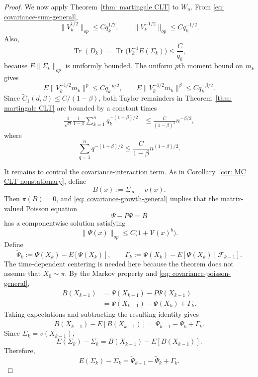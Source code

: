 \documentclass[11pt]{article}
\newcommand{\ve}{\mathscr{V}}
\begin{document}
\begin{proof}
We now apply Theorem~\ref{thm: martingale CLT} to $W_n$. From
\eqref{eq: covariance-sum-general},
\[
    \|V_k^{1/2}\|_{op}\leq Cq_k^{1/2},
    \qquad
    \|V_k^{-1/2}\|_{op}\leq Cq_k^{-1/2}.
\]
Also,
\[
    \operatorname{Tr}(D_k)
    =
    \operatorname{Tr}\bigl(V_k^{-1}E(\Sigma_k)\bigr)
    \leq
    \frac{C}{q_k},
\]
because $E\|\Sigma_k\|_{op}$ is uniformly bounded. The uniform $p$th
moment bound on $m_k$ gives
\[
    E\|V_k^{-1/2}m_k\|^p\leq Cq_k^{-p/2},
    \qquad
    E\|V_k^{-1/2}m_k\|^\beta\leq Cq_k^{-\beta/2}.
\]
Since $\widetilde C_1(d,\beta)\leq C/(1-\beta)$, both Taylor remainders in
Theorem~\ref{thm: martingale CLT} are bounded by a constant times
\begin{align*}
\frac1{\sqrt n}\frac1{1-\beta}
\sum_{k=1}^n q_k^{-(1+\beta)/2}
&\leq
\frac{C}{(1-\beta)^2}n^{-\beta/2},
\end{align*}
where
\[
    \sum_{q=1}^n q^{-(1+\beta)/2}
    \leq
    \frac{C}{1-\beta}n^{(1-\beta)/2}.
\]

It remains to control the covariance-interaction term. As in Corollary~\ref{cor: MC CLT nonstationary}, define
\[
    B(x):=\Sigma_\infty-v(x).
\]
Then $\pi (B)=0$, and \eqref{eq: covariance-growth-general} implies that the
matrix-valued Poisson equation
\begin{equation}\label{eq: covariance-poisson-general}
    \Psi-P\Psi=B
\end{equation}
has a componentwise solution satisfying
\begin{equation}\label{eq: covariance-poisson-growth-general}
    \|\Psi(x)\|_{op}
    \leq
    C\bigl(1+\ve(x)^b\bigr).
\end{equation}
Define
\[
    \widetilde\Psi_k
    :=
    \Psi(X_k)-E[\Psi(X_k)],
    \qquad
    \Gamma_k
    :=
    \Psi(X_k)-E[\Psi(X_k)\mid\mathcal F_{k-1}].
\]
The time-dependent centering is needed here because the theorem does not
assume that $X_0\sim\pi$. By the Markov property and
\eqref{eq: covariance-poisson-general},
\begin{align*}
B(X_{k-1})
&=
\Psi(X_{k-1})-P\Psi(X_{k-1})\\
&=
\Psi(X_{k-1})-\Psi(X_k)+\Gamma_k.
\end{align*}
Taking expectations and subtracting the resulting identity gives
\[
    B(X_{k-1})-E[B(X_{k-1})]
    =
    \widetilde\Psi_{k-1}-\widetilde\Psi_k+\Gamma_k.
\]
Since $\Sigma_k=v(X_{k-1})$,
\[
    E(\Sigma_k)-\Sigma_k
    =
    B(X_{k-1})-E[B(X_{k-1})].
\]
Therefore,
\begin{equation}\label{eq: covariance-interaction-identity-general}
    E(\Sigma_k)-\Sigma_k
    =
    \widetilde\Psi_{k-1}-\widetilde\Psi_k+\Gamma_k.
\end{equation}


\end{proof}
\end{document}
